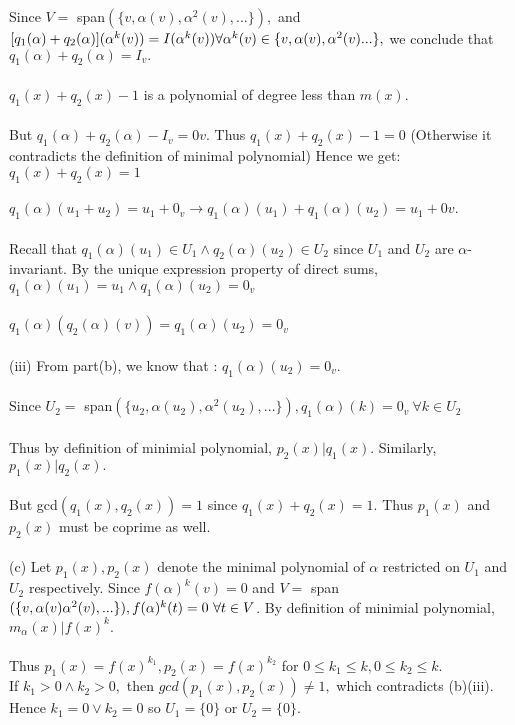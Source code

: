 \documentclass{article}
\begin{document}
Since $V = $ span$(\{v,\alpha(v),\alpha^2(v),...\}),$ and $[q_1(\alpha)+q_2(\alpha)](\alpha^k(v)) = I(\alpha^k(v))\\ \forall \alpha^k(v) \in \{v,\alpha(v),\alpha^2(v)...\},$ we conclude that $q_1(\alpha) + q_2(\alpha) = I_v.$\\\\
$q_1(x) + q_2(x) - 1$ is a polynomial of degree less than $m(x).$\\\\
But $q_1(\alpha) + q_2(\alpha) - I_v = 0v.$ Thus $q_1(x) + q_2(x) - 1 = 0$ (Otherwise it contradicts the definition of minimal polynomial) Hence we get: $q_1(x) + q_2(x) = 1$\\\\
$q_1(\alpha)(u_1+u_2) = u_1 + 0_v \to q_1(\alpha)(u_1) + q_1(\alpha)(u_2) = u_1 + 0v.$\\\\ Recall that $q_1(\alpha)(u_1) \in U_1 \land q_2(\alpha)(u_2) \in U_2$ since $U_1$ and $U_2$ are $\alpha$-invariant. By the unique expression property of direct sums, $q_1(\alpha)(u_1) = u_1 \land q_1(\alpha)(u_2) = 0_v$\\\\
$q_1(\alpha)(q_2(\alpha)(v)) = q_1(\alpha)(u_2) = 0_v$\\\\
(iii) From part(b), we know that : $q_1(\alpha)(u_2) = 0_v.$\\\\ Since $U_2 = $ span$(\{u_2,\alpha(u_2),\alpha^2(u_2),...\}), q_1(\alpha)(k) = 0_v\ \forall k\in U_2$\\\\
Thus by definition of minimial polynomial, $p_2(x)|q_1(x).$ Similarly, $p_1(x)|q_2(x).$\\\\ But gcd$(q_1(x),q_2(x))= 1$ since $q_1(x) + q_2(x) = 1$. Thus $p_1(x)$ and $p_2(x)$ must be coprime as well.\\\\
(c) Let $p_1(x),p_2(x)$ denote the minimal polynomial of $\alpha$ restricted on $U_1$ and $U_2$ respectively. Since $f(\alpha)^k(v) = 0$ and $V =$ span$(\{v,\alpha(v)\alpha^2(v),...\}), \\ f(\alpha)^k(t) = 0\ \forall t\in V$. By definition of minimial polynomial, $m_\alpha(x)|f(x)^k.$\\\\
Thus $p_1(x) = f(x)^{k_1}, p_2(x) = f(x)^{k_2}$ for $ 0\leq k_1\leq k, 0\leq k_2\leq k.$\\ If $k_1 > 0 \land k_2 > 0,$ then $gcd(p_1(x),p_2(x)) \neq 1,$ which contradicts (b)(iii). Hence $k_1 = 0 \lor k_2 = 0$ so $U_1 = \{0\}$ or $ U_2 = \{0\}.$\\\\\\
\end{document}
